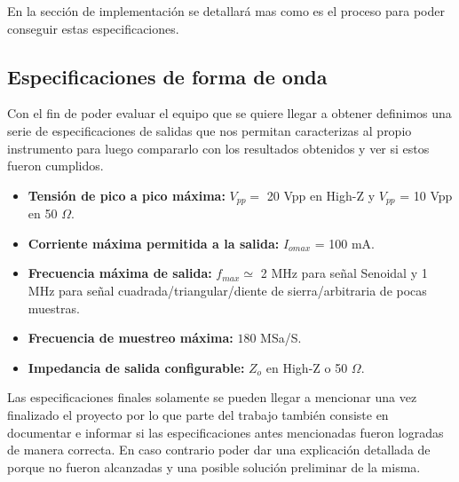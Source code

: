 En la sección de implementación se detallará mas como es el proceso para poder conseguir estas especificaciones.

\subsection{Especificaciones de forma de onda}
Con el fin de poder evaluar el equipo que se quiere llegar a obtener definimos una serie de especificaciones de salidas que nos permitan caracterizas al propio instrumento para luego compararlo con los resultados obtenidos y ver si estos fueron cumplidos.

\begin{itemize}
	\item \textbf{Tensión de pico a pico máxima:} $V_{pp} = $ 20 Vpp en High-Z y $V_{pp}$ = 10 Vpp en 50 $\Omega$.
	\item \textbf{Corriente máxima permitida a la salida:} $I_{omax}$ = 100 mA.
	\item \textbf{Frecuencia máxima de salida:} $f_{max} \simeq$ 2 MHz para señal Senoidal y 1 MHz para señal cuadrada/triangular/diente de sierra/arbitraria de pocas muestras.
	\item \textbf{Frecuencia de muestreo máxima:} $180$ MSa/S.
	\item \textbf{Impedancia de salida configurable:} $Z_o$ en High-Z o 50 $\Omega$.
\end{itemize}

\begin{center}
	\begin{YStkyNote}[Nota]
		Las especificaciones finales solamente se pueden llegar a mencionar una vez finalizado el proyecto por lo que parte del trabajo también consiste en documentar e informar si las especificaciones antes mencionadas fueron logradas de manera correcta. En caso contrario poder dar una explicación detallada de porque no fueron alcanzadas y una posible solución preliminar de la misma.
	\end{YStkyNote}
\end{center}

